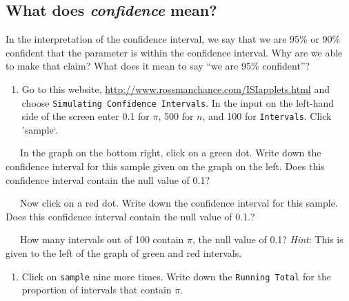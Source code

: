 \documentclass[
]{report}
\providecommand{\tightlist}{%
  \setlength{\itemsep}{0pt}\setlength{\parskip}{0pt}}
\begin{document}
\vspace{0.5in}

\newpage

\hypertarget{what-does-confidence-mean}{%
\subsection{\texorpdfstring{What does \emph{confidence} mean?}{What does confidence mean?}}\label{what-does-confidence-mean}}

In the interpretation of the confidence interval, we say that we are 95\% or 90\% confident that the parameter is within the confidence interval. Why are we able to make that claim? What does it mean to say ``we are 95\% confident''?

\begin{enumerate}
\def\labelenumi{\arabic{enumi}.}
\setcounter{enumi}{15}
\tightlist
\item
  Go to this website, \url{http://www.rossmanchance.com/ISIapplets.html} and choose \texttt{Simulating\ Confidence\ Intervals}. In the input on the left-hand side of the screen enter 0.1 for \(\pi\), 500 for \(n\), and 100 for \texttt{Intervals}. Click 'sample`.
  \vspace{1mm}
\end{enumerate}

~~~In the graph on the bottom right, click on a green dot. Write down the confidence interval for this sample given on the graph on the left. Does this confidence interval contain the null value of 0.1?

\vspace{0.5in}

~~~Now click on a red dot. Write down the confidence interval for this sample. Does this confidence interval contain the null value of 0.1.?

\vspace{0.5in}

~~~How many intervals out of 100 contain \(\pi\), the null value of 0.1? \emph{Hint}: This is given to the left of the graph of green and red intervals.

\vspace{0.5in}

\begin{enumerate}
\def\labelenumi{\arabic{enumi}.}
\setcounter{enumi}{16}
\tightlist
\item
  Click on \texttt{sample} nine more times. Write down the \texttt{Running\ Total} for the proportion of intervals that contain \(\pi\).
\end{enumerate}
\end{document}
